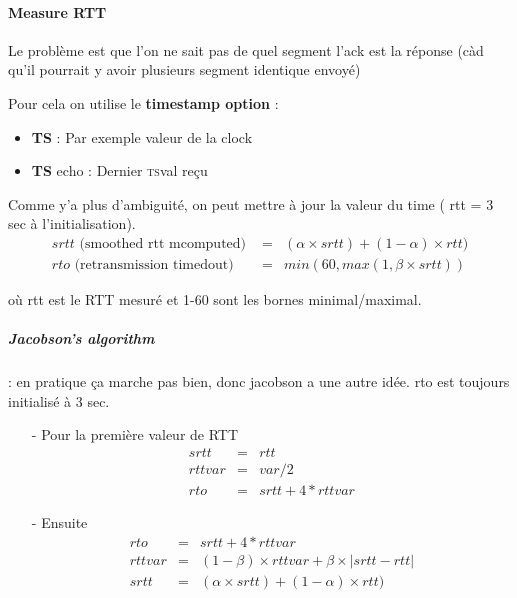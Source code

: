 \paragraph{Measure RTT }
Le problème est que l'on ne sait pas de quel segment l'ack est la réponse (càd qu'il pourrait
y avoir plusieurs segment identique envoyé)

Pour cela on utilise le \textbf{timestamp option} :
\begin{itemize}
    \item \textbf{TS} : Par exemple valeur de la clock
    \item \textbf{TS} echo : Dernier \textsc{ts}val reçu
\end{itemize}

Comme y'a plus d'ambiguité, on peut mettre à jour la valeur du time ( rtt = 3 sec à l'initialisation).
\begin{eqnarray*}
srtt \textrm{ (smoothed rtt mcomputed) } &=&  (\alpha \times srtt) + (1-\alpha) \times rtt) \\
rto \textrm{ (retransmission timedout) } &=& min(60, max(1, \beta \times srtt))
\end{eqnarray*}

où rtt est le RTT mesuré et 1-60 sont les bornes minimal/maximal.


\subparagraph{Jacobson's algorithm} : en pratique ça marche pas bien, donc jacobson a une
autre idée. rto est toujours initialisé à 3 sec.
\begin{multicols}{2}
\begin{itemize}
    \item[-] Pour la première valeur de RTT
        \begin{eqnarray*}
            srtt &=& rtt \\
            rttvar &=& var / 2 \\
            rto &=& srtt + 4 * rttvar 
        \end{eqnarray*}

    \item[-] Ensuite
        \begin{eqnarray*}
        rto &=& srtt + 4*rttvar \\
        rttvar &=& (1-\beta) \times rttvar + \beta \times |srtt - rtt| \\
        srtt &=&  (\alpha \times srtt) + (1-\alpha) \times rtt) 
        \end{eqnarray*}
\end{itemize}
\end{multicols}

